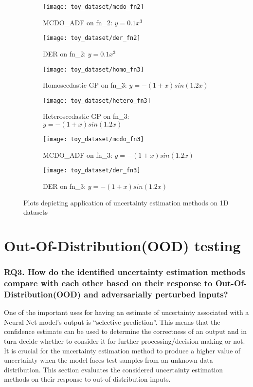 \begin{figure}[H]\ContinuedFloat
	\centering
	\begin{subfigure}[b]{0.4\textwidth}
		\centering
		\texttt{[image: toy\_dataset/mcdo\_fn2]}
		\caption{MCDO\_ADF on fn\_2: $y=0.1x^3$}
		\label{mcdo_fn2}
	\end{subfigure}
	\hfill
	\begin{subfigure}[b]{0.4\textwidth}
		\centering
		\texttt{[image: toy\_dataset/der\_fn2]}
		\caption{DER on fn\_2: $y=0.1x^3$}
		\label{der_fn2}
	\end{subfigure}
	\hfill
	\begin{subfigure}[b]{0.4\textwidth}
		\centering
		\texttt{[image: toy\_dataset/homo\_fn3]}
		\caption{Homoscedastic GP on fn\_3: $y=-(1+x)sin(1.2x)$}
		\label{homo_fn3}
	\end{subfigure}
	\hfill
	\begin{subfigure}[b]{0.4\textwidth}
		\centering
		\texttt{[image: toy\_dataset/hetero\_fn3]}
		\caption{Heteroscedastic GP on fn\_3: $y=-(1+x)sin(1.2x)$}
		\label{hetero_fn3}
	\end{subfigure}
	\hfill
	\begin{subfigure}[b]{0.4\textwidth}
		\centering
		\texttt{[image: toy\_dataset/mcdo\_fn3]}
		\caption{MCDO\_ADF on fn\_3: $y=-(1+x)sin(1.2x)$}
		\label{mcdo_fn3}
	\end{subfigure}
	\hfill
	\begin{subfigure}[b]{0.4\textwidth}
		\centering
		\texttt{[image: toy\_dataset/der\_fn3]}
		\caption{DER on fn\_3: $y=-(1+x)sin(1.2x)$}
		\label{der_fn3}
	\end{subfigure}
	\hfill
	\caption{Plots depicting application of uncertainty estimation methods on 1D datasets}
	\label{fig_1d_functions}
\end{figure}


\section{Out-Of-Distribution(OOD) testing}
\subsubsection{\textbf{RQ3.} How do the identified uncertainty estimation methods compare with each other based on their response to Out-Of-Distribution(OOD) and adversarially perturbed inputs?}
One of the important uses for having an estimate of uncertainty associated with a Neural Net model's output is \enquote{selective prediction}. This means that the confidence estimate can be used to determine the correctness of an output and in turn decide whether to consider it for further processing/decision-making or not. It is crucial for the uncertainty estimation method to produce a higher value of uncertainty when the model faces test samples from an unknown data distribution. This section evaluates the considered uncertainty estimation methods on their response to out-of-distribution inputs.
